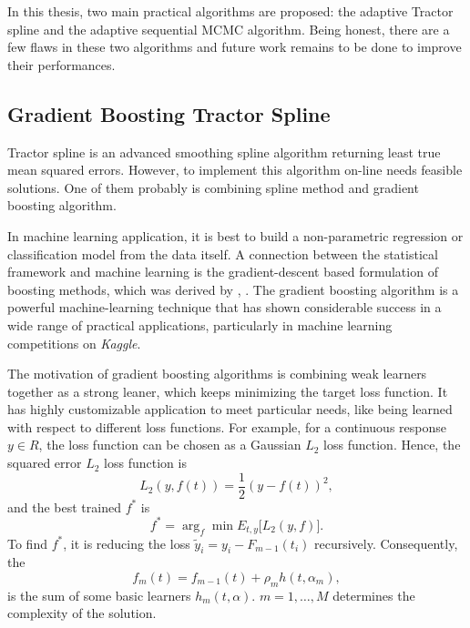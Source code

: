 
In this thesis, two main practical algorithms are proposed: the adaptive Tractor spline and the adaptive sequential MCMC algorithm. Being honest, there are a few flaws in these two algorithms and future work remains to be done to improve their performances. 


\subsection*{Gradient Boosting Tractor Spline}

Tractor spline is an advanced smoothing spline algorithm returning least true mean squared errors. However, to implement this algorithm on-line needs feasible solutions. One of them probably is combining spline method and gradient boosting algorithm. 


In machine learning application, it is best to build a non-parametric regression or classification model from the data itself. A connection between the statistical framework and machine learning is the gradient-descent based formulation of boosting methods, which was derived by \cite{freund1995desicion}, \cite{friedman2001greedy}. The gradient boosting algorithm is a powerful machine-learning technique that has shown considerable success in a wide range of practical applications, particularly in machine learning competitions on \textit{Kaggle}. 


The motivation of gradient boosting algorithms is combining weak learners together as a strong leaner, which keeps minimizing the target loss function. 
It has highly customizable application to meet particular needs, like being learned with respect to different loss functions. For example, for a continuous response $y\in \mathit{R}$, the loss function can be chosen as a Gaussian $L_2$ loss function. Hence, the squared error $L_2$ loss function is 
\begin{equation*}
L_2(y,f(t)) = \frac{1}{2}\left(y-f(t)\right)^2,
\end{equation*}
and the best trained $f^*$ is 
\begin{equation*}
f^* = \arg_{f}\min E_{t,y}\lbrack L_2\left(y,f\right)\rbrack.
\end{equation*}
To find $f^*$, it is reducing the loss $\tilde{y}_i=y_i-F_{m-1}(t_i)$ recursively. Consequently, the 
\begin{equation*}
f_m(t) = f_{m-1}(t)+ \rho_mh(t,\alpha_m),
\end{equation*}
is the sum of some basic learners $h_m(t,\alpha)$. $m=1,\ldots,M$ determines the complexity of the solution. 


